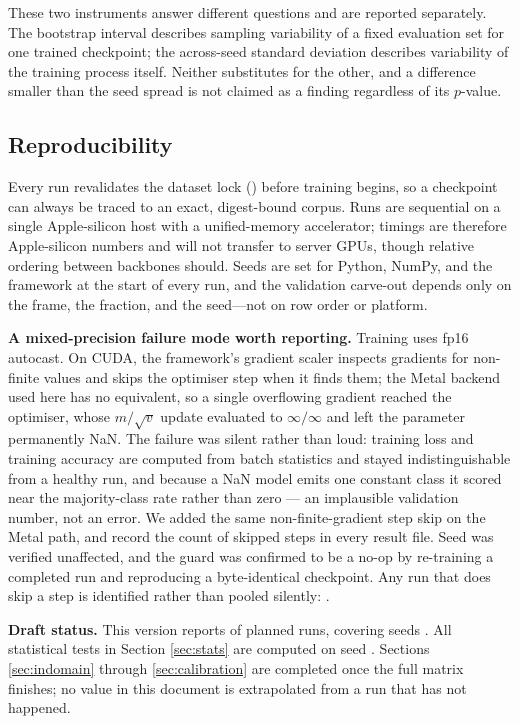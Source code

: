 \documentclass[runningheads]{llncs}
\begin{document}
These two instruments answer different questions and are reported separately.
The bootstrap interval describes sampling variability of a fixed evaluation set
for one trained checkpoint; the across-seed standard deviation describes
variability of the training process itself. Neither substitutes for the other,
and a difference smaller than the seed spread is not claimed as a finding
regardless of its $p$-value.

\subsection{Reproducibility}

Every run revalidates the dataset lock (\LockDigestFull{}) before training
begins, so a checkpoint can always be traced to an exact, digest-bound corpus.
Runs are sequential on a single Apple-silicon host with a unified-memory
accelerator; timings are therefore Apple-silicon numbers and will not transfer
to server GPUs, though relative ordering between backbones should. Seeds are
set for Python, NumPy, and the framework at the start of every run, and the
validation carve-out depends only on the frame, the fraction, and the seed---not
on row order or platform.

\textbf{A mixed-precision failure mode worth reporting.} Training uses fp16
autocast. On CUDA, the framework's gradient scaler inspects gradients for
non-finite values and skips the optimiser step when it finds them; the
Metal backend used here has no equivalent, so a single overflowing gradient
reached the optimiser, whose $m/\sqrt{v}$ update evaluated to $\infty/\infty$
and left the parameter permanently NaN. The failure was silent rather than
loud: training loss and training accuracy are computed from batch statistics
and stayed indistinguishable from a healthy run, and because a NaN model emits
one constant class it scored near the majority-class rate rather than zero ---
an implausible validation number, not an error. We added the same
non-finite-gradient step skip on the Metal path, and record the count of
skipped steps in every result file. Seed \SigSeed{} was verified unaffected,
and the guard was confirmed to be a no-op by re-training a completed run and
reproducing a byte-identical checkpoint. Any run that does skip a step is
identified rather than pooled silently: \SkippedStepsNote{}.

\textbf{Draft status.} This version reports \NRunsDone{} of \NRunsPlanned{}
planned runs, covering seeds \SeedList{}. All statistical tests in Section
\ref{sec:stats} are computed on seed \SigSeed{}. Sections \ref{sec:indomain}
through \ref{sec:calibration} are completed once the full matrix finishes; no
value in this document is extrapolated from a run that has not happened.
\end{document}
